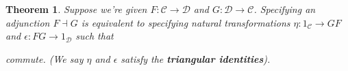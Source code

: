 \documentclass[a4paper]{article}
\newtheorem{theorem}[definition]{Theorem}
\numberwithin{definition}{section}
\begin{document}
\begin{theorem}
	Suppose we're given $F: \mathcal{C} \to \mathcal{D}$ and $G: \mathcal{D} \to \mathcal{C}$.
	Specifying an adjunction $F \dashv G$ is equivalent to specifying natural transformations
	$\eta: 1_\mathcal{C} \to GF$ and $\epsilon: FG \to 1_\mathcal{D}$ such that
	\begin{center}
	\end{center}
	commute.
	(We say $\eta$ and $\epsilon$ satisfy the \textbf{triangular identities}).
\end{theorem}
\end{document}
